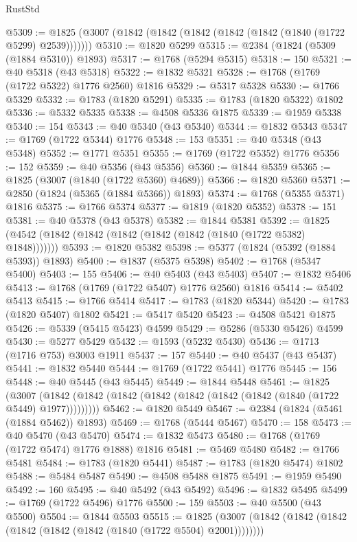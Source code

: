 \begin{lexlean}{RustStd}
\begin{coremodule}
@5309 := @1825 (@3007 (@1842 (@1842 (@1842 (@1842 (@1842 (@1840 (@1722 @5299) @2539)))))))
@5310 := @1820 @5299
@5315 := @2384 (@1824 (@5309 (@1884 @5310)) @1893)
@5317 := @1768 (@5294 @5315)
@5318 := 150
@5321 := @40 @5318 (@43 @5318)
@5322 := @1832 @5321
@5328 := @1768 (@1769 (@1722 @5322) @1776 @2560) @1816
@5329 := @5317 @5328
@5330 := @1766 @5329
@5332 := @1783 (@1820 @5291)
@5335 := @1783 (@1820 @5322) @1802
@5336 := @5332 @5335
@5338 := @4508 @5336 @1875
@5339 := @1959 @5338
@5340 := 154
@5343 := @40 @5340 (@43 @5340)
@5344 := @1832 @5343
@5347 := @1769 (@1722 @5344) @1776
@5348 := 153
@5351 := @40 @5348 (@43 @5348)
@5352 := @1771 @5351
@5355 := @1769 (@1722 @5352) @1776
@5356 := 152
@5359 := @40 @5356 (@43 @5356)
@5360 := @1844 @5359
@5365 := @1825 (@3007 (@1840 (@1722 @5360) @4689))
@5366 := @1820 @5360
@5371 := @2850 (@1824 (@5365 (@1884 @5366)) @1893)
@5374 := @1768 (@5355 @5371) @1816
@5375 := @1766 @5374
@5377 := @1819 (@1820 @5352)
@5378 := 151
@5381 := @40 @5378 (@43 @5378)
@5382 := @1844 @5381
@5392 := @1825 (@4542 (@1842 (@1842 (@1842 (@1842 (@1842 (@1840 (@1722 @5382) @1848)))))))
@5393 := @1820 @5382
@5398 := @5377 (@1824 (@5392 (@1884 @5393)) @1893)
@5400 := @1837 (@5375 @5398)
@5402 := @1768 (@5347 @5400)
@5403 := 155
@5406 := @40 @5403 (@43 @5403)
@5407 := @1832 @5406
@5413 := @1768 (@1769 (@1722 @5407) @1776 @2560) @1816
@5414 := @5402 @5413
@5415 := @1766 @5414
@5417 := @1783 (@1820 @5344)
@5420 := @1783 (@1820 @5407) @1802
@5421 := @5417 @5420
@5423 := @4508 @5421 @1875
@5426 := @5339 (@5415 @5423) @4599
@5429 := @5286 (@5330 @5426) @4599
@5430 := @5277 @5429
@5432 := @1593 (@5232 @5430)
@5436 := @1713 (@1716 @753) @3003 @1911
@5437 := 157
@5440 := @40 @5437 (@43 @5437)
@5441 := @1832 @5440
@5444 := @1769 (@1722 @5441) @1776
@5445 := 156
@5448 := @40 @5445 (@43 @5445)
@5449 := @1844 @5448
@5461 := @1825
    (@3007 (@1842 (@1842 (@1842 (@1842 (@1842 (@1842 (@1842 (@1840 (@1722 @5449) @1977)))))))))
@5462 := @1820 @5449
@5467 := @2384 (@1824 (@5461 (@1884 @5462)) @1893)
@5469 := @1768 (@5444 @5467)
@5470 := 158
@5473 := @40 @5470 (@43 @5470)
@5474 := @1832 @5473
@5480 := @1768 (@1769 (@1722 @5474) @1776 @1888) @1816
@5481 := @5469 @5480
@5482 := @1766 @5481
@5484 := @1783 (@1820 @5441)
@5487 := @1783 (@1820 @5474) @1802
@5488 := @5484 @5487
@5490 := @4508 @5488 @1875
@5491 := @1959 @5490
@5492 := 160
@5495 := @40 @5492 (@43 @5492)
@5496 := @1832 @5495
@5499 := @1769 (@1722 @5496) @1776
@5500 := 159
@5503 := @40 @5500 (@43 @5500)
@5504 := @1844 @5503
@5515 := @1825 (@3007 (@1842 (@1842 (@1842 (@1842 (@1842 (@1842 (@1840 (@1722 @5504) @2001))))))))

\end{coremodule}
\end{lexlean}
